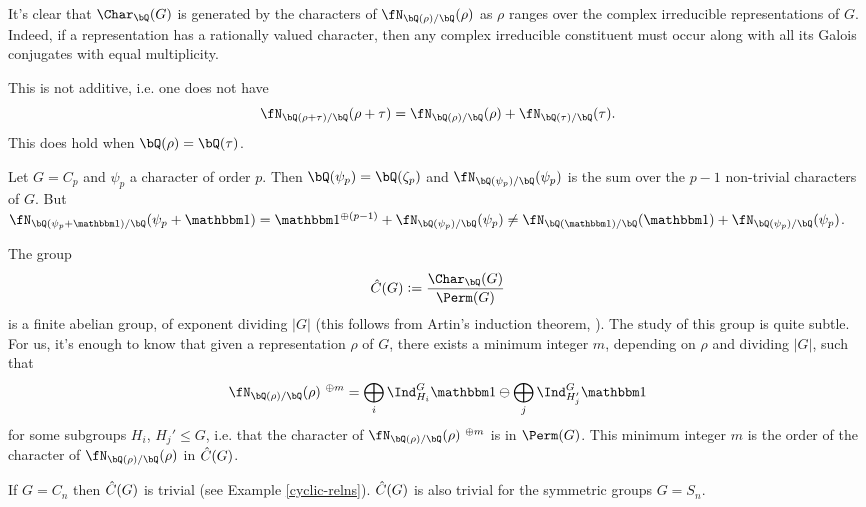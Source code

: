 It's clear that $\Char_{\bQ}(G)$ is generated by the characters of $\repnorm{\rho}$ as $\rho$ ranges over the complex irreducible representations of $G$. Indeed, if a representation has a rationally valued character, then any complex irreducible constituent must occur along with all its Galois conjugates with equal multiplicity.

\begin{rem}
This is not additive, i.e. one does not have \[\repnorm{\rho + \tau} = \repnorm{\rho} + \repnorm{\tau}. \] 
This does hold when $\bQ(\rho) = \bQ(\tau)$. 
\end{rem}

\begin{example}
    Let $G = C_p$ and $\psi_p$ a character of order $p$. Then $\bQ(\psi_p) = \bQ(\zeta_p)$ and $\repnorm{\psi_p}$ is the sum over the $p - 1$ non-trivial characters of $G$. But $\repnorm{\psi_p + \trivial} = \trivial^{\oplus (p - 1)} + \repnorm{\psi_p} \not= \repnorm{\trivial} + \repnorm{\psi_p}$.
\end{example}



\begin{rem}\label{image-of-burnside}
The group $$\C(G) \defeq \frac{\Char_{\bQ}(G)}{\Perm(G)}$$ is a finite abelian group, of exponent dividing $|G|$ (this follows from Artin's induction theorem, \cite[Theorem 17]{Serre}). The study of this group is quite subtle. For us, it's enough to know that given a representation $\rho$ of $G$, there exists a minimum integer $m$, depending on $\rho$ and dividing $|G|$, such that 
\[ \repnorm{\rho}^{\ \oplus m } = \bigoplus_i \Ind_{H_i}^G \trivial \ominus \bigoplus_j \Ind_{H_j'}^{G} \trivial \]
for some subgroups $H_i$, $H_j' \leq G$, i.e. that the character of $\repnorm{\rho}^{\ \oplus m }$ is in $\Perm(G)$. This minimum integer $m$ is the order of the character of $\repnorm{\rho}$ in $\hat{C}(G)$. 
\end{rem}
\begin{example}
If $G = C_n$ then $\hat{C}(G)$ is trivial (see Example \ref{cyclic-relns}). $\hat{C}(G)$ is also trivial for the symmetric groups $G = S_n$. 
\end{example}


